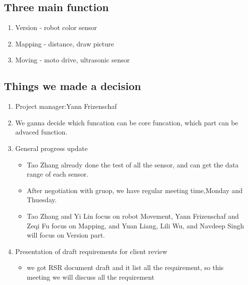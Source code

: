 \documentclass[11pt, a4paper]{article}
\begin{document}
\subsection{Three main function }



\begin{enumerate}

\item Version - robot color sensor

\item Mapping - distance, draw picture

\item Moving - moto drive, ultrasonic sensor

\end{enumerate}



\subsection{Things we made a decision}

\begin{enumerate}

\item Project manager:Yann Frizenschaf

\item We ganna decide which funcation can be core funcation, which part can be advaced function.





\item General progress update



\begin{itemize}

\item Tao Zhang already done the test of all the sensor, and can get the data range of each sensor.

\item After negotiation with gruop, we have regular meeting time,Monday and Thuesday.

\item Tao Zhang and Yi Lin focus on robot Movement, Yann Frizenschaf and Zeqi  Fu focus on Mapping, and Yuan Liang, Lili Wu, and Navdeep Singh will focus on Version part.

\end{itemize}



\item Presentation of draft requirements for client review

\begin{itemize}

\item we got RSR document draft and it list all the requirement, so this meeting we will discuss all the requirement

\end{itemize}

\end{enumerate}
\end{document}
